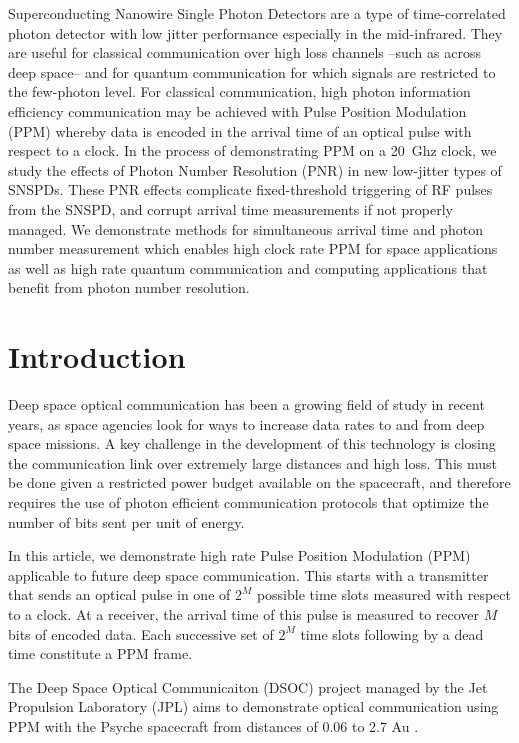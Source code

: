 \documentclass[11pt]{caltech_thesis} %
\begin{document}
Superconducting Nanowire Single Photon Detectors are a type of time-correlated photon detector with low jitter performance especially in the mid-infrared. They are useful for classical communication over high loss channels --such as across deep space-- and for quantum communication for which signals are restricted to the few-photon level. For classical communication, high photon information efficiency communication may be achieved with Pulse Position Modulation (PPM) whereby data is encoded in the arrival time of an optical pulse with respect to a clock. In the process of demonstrating PPM on a 20~Ghz clock, we study the effects of Photon Number Resolution (PNR) in new low-jitter types of SNSPDs. These PNR effects complicate fixed-threshold triggering of RF pulses from the SNSPD, and corrupt arrival time measurements if not properly managed. We demonstrate methods for simultaneous arrival time and photon number measurement which enables high clock rate PPM for space applications as well as high rate quantum communication and computing applications that benefit from photon number resolution.

\hypertarget{introduction-2}{%
\section{Introduction}\label{introduction-2}}

Deep space optical communication has been a growing field of study in recent years, as space agencies look for ways to increase data rates to and from deep space missions. A key challenge in the development of this technology is closing the communication link over extremely large distances and high loss. This must be done given a restricted power budget available on the spacecraft, and therefore requires the use of photon efficient communication protocols that optimize the number of bits sent per unit of energy.

In this article, we demonstrate high rate Pulse Position Modulation (PPM) applicable to future deep space communication. This starts with a transmitter that sends an optical pulse in one of $2^M$ possible time slots measured with respect to a clock. At a receiver, the arrival time of this pulse is measured to recover $M$ bits of encoded data. Each successive set of $2^M$ time slots following by a dead time constitute a PPM frame.

The Deep Space Optical Communicaiton (DSOC) project managed by the Jet Propulsion Laboratory (JPL) aims to demonstrate optical communication using PPM with the Psyche spacecraft from distances of 0.06 to 2.7 Au \autocite{Srinivasan2023GroundReceiver}.
\end{document}
